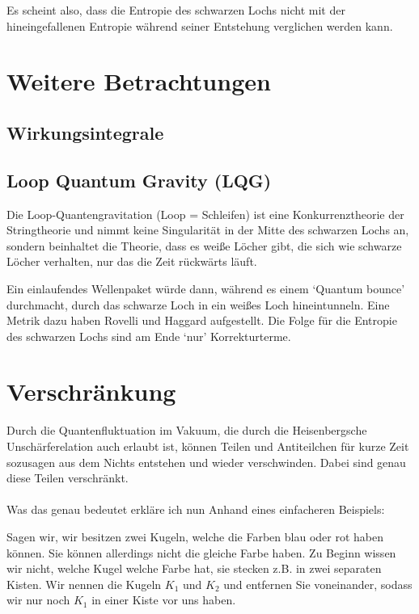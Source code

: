 \documentclass[ngerman]{scrartcl}
\begin{document}
	Es scheint also, dass die Entropie des schwarzen Lochs nicht mit der hineingefallenen Entropie während seiner Entstehung verglichen werden kann.	
	
\section{Weitere Betrachtungen}
	\subsection{Wirkungsintegrale}
	\subsection{Loop Quantum Gravity (LQG)}	%
Die Loop-Quantengravitation (Loop = Schleifen) ist eine Konkurrenztheorie der Stringtheorie und nimmt keine Singularität in der Mitte des schwarzen Lochs an, sondern beinhaltet die Theorie, dass es weiße Löcher gibt, die sich wie schwarze Löcher verhalten, nur das die Zeit rückwärts läuft. 

Ein einlaufendes Wellenpaket würde dann, während es einem `Quantum bounce' durchmacht, durch das schwarze Loch in ein weißes Loch hineintunneln. Eine Metrik dazu haben Rovelli und Haggard \cite{LQGRovelli} aufgestellt. Die Folge für die Entropie des schwarzen Lochs sind am Ende `nur' Korrekturterme.


\appendix
\section{Verschränkung} \label{Verschränkung}
	Durch die Quantenfluktuation im Vakuum, die durch die Heisenbergsche Unschärferelation auch erlaubt ist, können Teilen und Antiteilchen für kurze Zeit sozusagen aus dem Nichts entstehen und wieder verschwinden. Dabei sind genau diese Teilen verschränkt.
	\\ \\
	Was das genau bedeutet erkläre ich nun Anhand eines einfacheren Beispiels:
	
	Sagen wir, wir besitzen zwei Kugeln, welche die Farben blau oder rot haben können. Sie können allerdings nicht die gleiche Farbe haben. 
	Zu Beginn wissen wir nicht, welche Kugel welche Farbe hat, sie stecken z.B. in zwei separaten Kisten. Wir nennen die Kugeln $K_1$ und $K_2$ und entfernen Sie voneinander, sodass wir nur noch $K_1$ in einer Kiste vor uns haben. 
	
\end{document}
